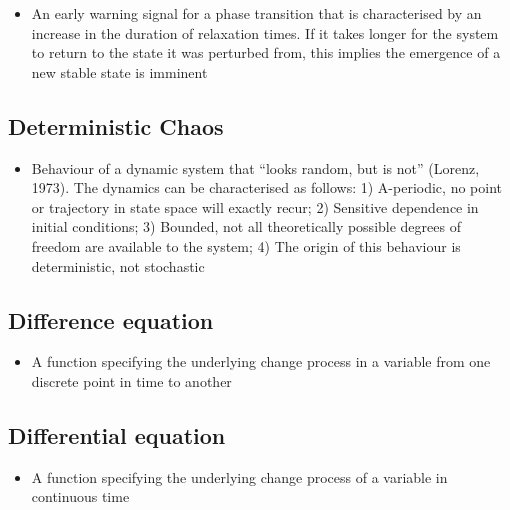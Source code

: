 \documentclass[12pt,]{book}
\providecommand{\tightlist}{%
  \setlength{\itemsep}{0pt}\setlength{\parskip}{0pt}}
\begin{document}
\begin{itemize}
\tightlist
\item
  An early warning signal for a phase transition that is characterised by an increase in the duration of relaxation times. If it takes longer for the system to return to the state it was perturbed from, this implies the emergence of a new stable state is imminent
\end{itemize}

\hypertarget{Dete17}{%
\subsection*{\texorpdfstring{\textbf{Deterministic Chaos}}{Deterministic Chaos}}\label{Dete17}}

\begin{itemize}
\tightlist
\item
  Behaviour of a dynamic system that ``looks random, but is not'' (Lorenz, 1973). The dynamics can be characterised as follows: 1) A-periodic, no point or trajectory in state space will exactly recur; 2) Sensitive dependence in initial conditions; 3) Bounded, not all theoretically possible degrees of freedom are available to the system; 4) The origin of this behaviour is deterministic, not stochastic
\end{itemize}

\hypertarget{Diff18}{%
\subsection*{\texorpdfstring{\textbf{Difference equation}}{Difference equation}}\label{Diff18}}

\begin{itemize}
\tightlist
\item
  A function specifying the underlying change process in a variable from one discrete point in time to another
\end{itemize}

\hypertarget{Diff19}{%
\subsection*{\texorpdfstring{\textbf{Differential equation}}{Differential equation}}\label{Diff19}}

\begin{itemize}
\tightlist
\item
  A function specifying the underlying change process of a variable in continuous time
\end{itemize}
\end{document}
